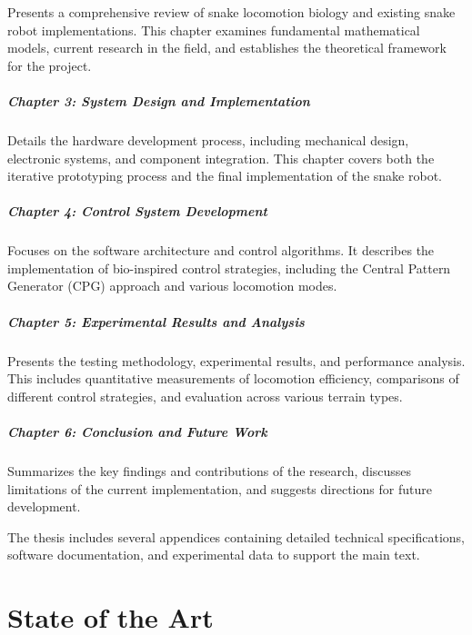 \documentclass[12pt,a4paper]{report}
\begin{document}
Presents a comprehensive review of snake locomotion biology and existing snake robot implementations. This chapter examines fundamental mathematical models, current research in the field, and establishes the theoretical framework for the project.

\paragraph{Chapter 3: System Design and Implementation} 
Details the hardware development process, including mechanical design, electronic systems, and component integration. This chapter covers both the iterative prototyping process and the final implementation of the snake robot.

\paragraph{Chapter 4: Control System Development} Focuses on the software architecture and control algorithms. It describes the implementation of bio-inspired control strategies, including the Central Pattern Generator (CPG) approach and various locomotion modes.

\paragraph{Chapter 5: Experimental Results and Analysis} Presents the testing methodology, experimental results, and performance analysis. This includes quantitative measurements of locomotion efficiency, comparisons of different control strategies, and evaluation across various terrain types.

\paragraph{Chapter 6: Conclusion and Future Work} Summarizes the key findings and contributions of the research, discusses limitations of the current implementation, and suggests directions for future development.

The thesis includes several appendices containing detailed technical specifications, software documentation, and experimental data to support the main text.
\chapter{State of the Art}
\end{document}
